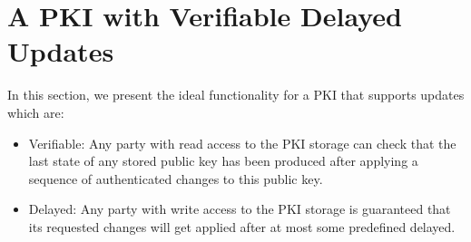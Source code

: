 \section{A PKI with Verifiable Delayed Updates}
\label{sec:pkivdu}

In this section, we present the ideal functionality for a PKI that supports
updates which are:

\begin{itemize}
\item Verifiable: Any party with read access to the PKI storage can check
  that the last state of any stored public key has been produced after
  applying a sequence of authenticated changes to this public key.
\item Delayed: Any party with write access to the PKI storage is guaranteed
  that its requested changes will get applied after at most some predefined
  delayed.
\end{itemize}



